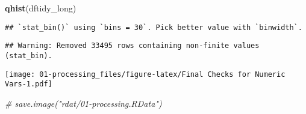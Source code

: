 \documentclass[]{article}
\newenvironment{Shaded}{\begin{snugshade}}{\end{snugshade}}
\newcommand{\CommentTok}[1]{\textcolor[rgb]{0.56,0.35,0.01}{\textit{#1}}}
\newcommand{\DataTypeTok}[1]{\textcolor[rgb]{0.13,0.29,0.53}{#1}}
\newcommand{\DecValTok}[1]{\textcolor[rgb]{0.00,0.00,0.81}{#1}}
\newcommand{\KeywordTok}[1]{\textcolor[rgb]{0.13,0.29,0.53}{\textbf{#1}}}
\newcommand{\NormalTok}[1]{#1}
\newcommand{\OperatorTok}[1]{\textcolor[rgb]{0.81,0.36,0.00}{\textbf{#1}}}
\newcommand{\StringTok}[1]{\textcolor[rgb]{0.31,0.60,0.02}{#1}}
\begin{document}
\begin{Shaded}
\end{Shaded}

\begin{Shaded}
\end{Shaded}

\begin{Shaded}
\end{Shaded}

\begin{Shaded}
\begin{Highlighting}[]
\KeywordTok{qhist}\NormalTok{(dftidy_long)}
\end{Highlighting}
\end{Shaded}

\begin{verbatim}
## `stat_bin()` using `bins = 30`. Pick better value with `binwidth`.
\end{verbatim}

\begin{verbatim}
## Warning: Removed 33495 rows containing non-finite values (stat_bin).
\end{verbatim}

\texttt{[image: 01-processing\_files/figure-latex/Final Checks for Numeric Vars-1.pdf]}

\begin{Shaded}
\begin{Highlighting}[]
\CommentTok{# save.image("rdat/01-processing.RData")}
\end{Highlighting}
\end{Shaded}
\end{document}
